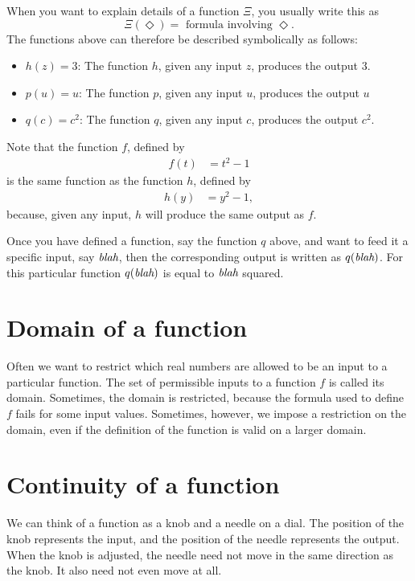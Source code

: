 \documentclass{math-deane}
\begin{document}
When you want to explain details of a function $\Xi$, you usually write this as
\[ \Xi(\Diamond) = \text{ formula involving }\Diamond. \]
The functions above can therefore be described symbolically as follows:

\begin{itemize}
\item $h(z) = 3$: The function $h$, given any input $z$, produces the output $3$.
\item $p(u) = u$: The function $p$, given any input $u$, produces the output $u$
\item $q(c) = c^2$: The function $q$, given any input $c$, produces the output $c^2$.
\end{itemize}

Note that the function $f$, defined by
\begin{align*}
f(t) &= t^2 - 1
\end{align*}
is the same function as the function $h$, defined by
\begin{align*}
h(y) &= y^2-1,
\end{align*}
because, given any input, $h$ will produce the same output as $f$.

Once you have defined a function, say the function $q$ above, and want to feed it a specific input, say $\text{\em blah}$, then the corresponding output is written as $q(\text{\em blah})$. For this particular function $q(\text{\em blah})$ is equal to $\text{\em blah}$ squared.

\section{Domain of a function}

Often we want to restrict which real numbers are allowed to be an input to a particular function. The set of permissible inputs to a function $f$ is called its domain. Sometimes, the domain is restricted, because the formula used to define $f$ fails for some input values. Sometimes, however, we impose a restriction on the domain, even if the definition of the function is valid on a larger domain.

\section{Continuity of a function}

We can think of a function as a knob and a needle on a dial. The position of the knob represents the input, and the position of the needle represents the output. When the knob is adjusted, the needle need not move in the same direction as the knob. It also need not even move at all.
\end{document}
